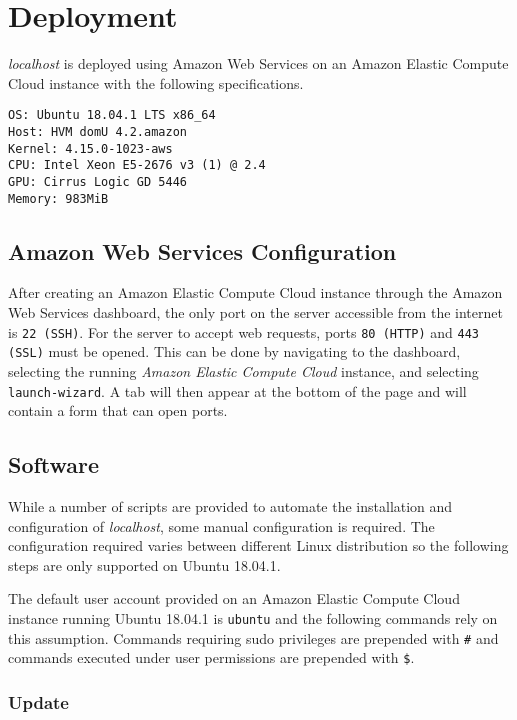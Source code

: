 \section{Deployment}

\emph{localhost} is deployed using Amazon Web Services on an Amazon Elastic
Compute Cloud instance with the following specifications.
\begin{lstlisting}
OS: Ubuntu 18.04.1 LTS x86_64
Host: HVM domU 4.2.amazon
Kernel: 4.15.0-1023-aws
CPU: Intel Xeon E5-2676 v3 (1) @ 2.4
GPU: Cirrus Logic GD 5446
Memory: 983MiB
\end{lstlisting}

\subsection{Amazon Web Services Configuration}

After creating an Amazon Elastic Compute Cloud instance through the Amazon Web
Services dashboard, the only port on the server accessible from the internet
is \lstinline{22 (SSH)}. For the server to accept web requests, ports
\lstinline{80 (HTTP)} and \lstinline{443 (SSL)} must be opened. This can be
done by navigating to the dashboard, selecting the running
\emph{Amazon Elastic Compute Cloud} instance, and selecting
\lstinline{launch-wizard}. A tab will then appear at the bottom of the page
and will contain a form that can open ports.

\subsection{Software}

While a number of scripts are provided to automate the installation and
configuration of \emph{localhost}, some manual configuration is required.
The configuration required varies between different Linux distribution so the
following steps are only supported on Ubuntu 18.04.1.

The default user account provided on an Amazon Elastic Compute Cloud instance
running Ubuntu 18.04.1 is \lstinline{ubuntu} and the following commands rely on
this assumption. Commands requiring sudo privileges are prepended with
\lstinline{#} and commands executed under user permissions are prepended with
\lstinline{$}.

\subsubsection{Update}

